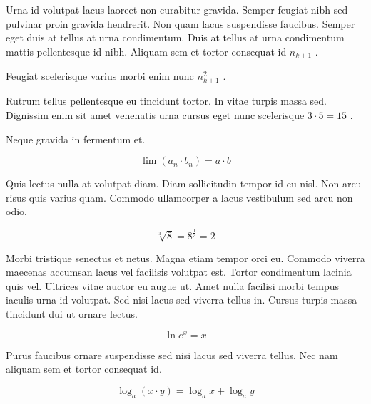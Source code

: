 \documentclass{article}
\begin{document}
	
    Urna id volutpat lacus laoreet non curabitur gravida. Semper feugiat nibh sed pulvinar proin gravida hendrerit. Non quam lacus suspendisse faucibus. Semper eget duis at tellus at urna condimentum. Duis at tellus at urna condimentum mattis pellentesque id nibh. Aliquam sem et tortor consequat id 
    \begin{math}
    n_{k+1}
    \end{math}
    .
    \newline
    
    Feugiat scelerisque varius morbi enim nunc 
    $ n_{k+1}^2 $
    .
    \newline
    
    Rutrum tellus pellentesque eu tincidunt tortor. In vitae turpis massa sed. Dignissim enim sit amet venenatis urna cursus eget nunc scelerisque 
    \( 3\cdot5=15 \)
    .
    \newline
    
    Neque gravida in fermentum et. 
    
    \[ \lim\left ( a_n\cdot b_n \right )=a\cdot b  \]
    
    Quis lectus nulla at volutpat diam. Diam sollicitudin tempor id eu nisl. Non arcu risus quis varius quam. Commodo ullamcorper a lacus vestibulum sed arcu non odio.
    
    $$ \sqrt[3]{8}=8^{\frac{1}{3}}=2 $$
    
    Morbi tristique senectus et netus. Magna etiam tempor orci eu. Commodo viverra maecenas accumsan lacus vel facilisis volutpat est. Tortor condimentum lacinia quis vel. Ultrices vitae auctor eu augue ut. Amet nulla facilisi morbi tempus iaculis urna id volutpat. Sed nisi lacus sed viverra tellus in. Cursus turpis massa tincidunt dui ut ornare lectus.
    
    \begin{displaymath}
    	\ln e^x = x
    \end{displaymath}
    
    Purus faucibus ornare suspendisse sed nisi lacus sed viverra tellus. Nec nam aliquam sem et tortor consequat id.
    
    \begin{equation}
    \log _{a}(x\cdot y)=\log _{a}x+\log _{a}y
    \end{equation}
    
\end{document}
